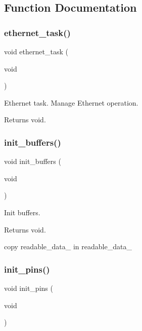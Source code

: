 \subsection{Function Documentation}
\mbox{\label{rmap_8ino_abac8959915b759aa6429243ab9599ee3}} 
\subsubsection{\texorpdfstring{ethernet\+\_\+task()}{ethernet\_task()}}
{\footnotesize\ttfamily void ethernet\+\_\+task (\begin{DoxyParamCaption}\item[{void}]{ }\end{DoxyParamCaption})}



Ethernet task. Manage Ethernet operation. 

\begin{DoxyReturn}{Returns}
void. 
\end{DoxyReturn}
\mbox{\label{rmap_8ino_ad241cc00b1a92e6d85827df96778e442}} 
\subsubsection{\texorpdfstring{init\+\_\+buffers()}{init\_buffers()}}
{\footnotesize\ttfamily void init\+\_\+buffers (\begin{DoxyParamCaption}\item[{void}]{ }\end{DoxyParamCaption})}



Init buffers. 

\begin{DoxyReturn}{Returns}
void. 
\end{DoxyReturn}
copy readable\+\_\+data\+\_ in readable\+\_\+data\+\_ \mbox{\label{rmap_8ino_ad8b80a0c08f928106018edd6ea435b95}} 
\subsubsection{\texorpdfstring{init\+\_\+pins()}{init\_pins()}}
{\footnotesize\ttfamily void init\+\_\+pins (\begin{DoxyParamCaption}\item[{void}]{ }\end{DoxyParamCaption})}



